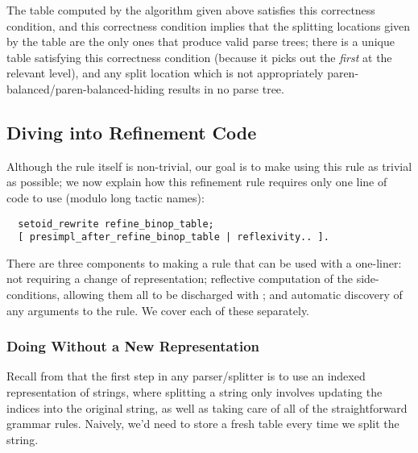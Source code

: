     The table computed by the algorithm given above satisfies this correctness condition, and this correctness condition implies that the splitting locations given by the table are the only ones that produce valid parse trees; there is a unique table satisfying this correctness condition (because it picks out the \emph{first} \terminal{+} at the relevant level), and any split location which is not appropriately paren-balanced/paren-balanced-hiding results in no parse tree.  
  
  \subsection{Diving into Refinement Code}
    
    
    Although the rule itself is non-trivial, our goal is to make using this rule as trivial as possible; we now explain how this refinement rule requires only one line of code to use (modulo long tactic names):
\begin{verbatim}
  setoid_rewrite refine_binop_table;
  [ presimpl_after_refine_binop_table | reflexivity.. ].
\end{verbatim}
    
    There are three components to making a rule that can be used with a one-liner: not requiring a change of representation; reflective computation of the side-conditions, allowing them all to be discharged with \tacREFLEXIVITY; and automatic discovery of any arguments to the rule.  We cover each of these separately.
    
    \subsubsection{Doing Without a New Representation}
      Recall from  that the first step in any parser/splitter  is to use an indexed representation of strings, where splitting a string only involves updating the indices into the original string, as well as taking care of all of the straightforward grammar rules.  Naively, we'd need to store a fresh table every time we split the string.
      
